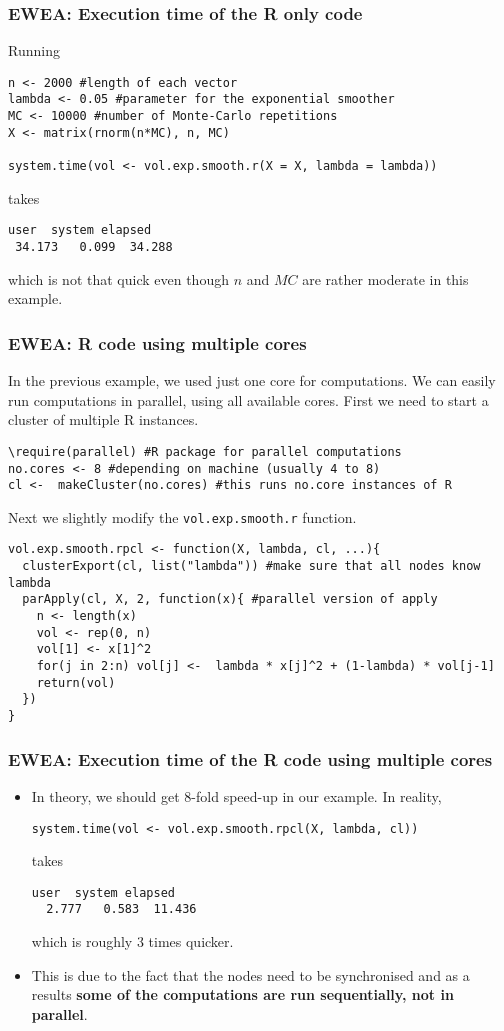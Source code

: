 \documentclass[handout]{beamer}
\begin{document}
\begin{frame}[fragile]
	\frametitle{EWEA: Execution time of the R only code} 
Running 

\begin{Verbatim}[fontsize=\footnotesize]
n <- 2000 #length of each vector
lambda <- 0.05 #parameter for the exponential smoother
MC <- 10000 #number of Monte-Carlo repetitions
X <- matrix(rnorm(n*MC), n, MC)

system.time(vol <- vol.exp.smooth.r(X = X, lambda = lambda))
\end{Verbatim}
takes
\begin{Verbatim}[fontsize=\footnotesize]
user  system elapsed 
 34.173   0.099  34.288 
\end{Verbatim}
which is not that quick even though $n$ and $MC$ are rather moderate in this example.
\end{frame}


\begin{frame}[fragile]
	\frametitle{EWEA: R code using multiple cores}
In the previous example, we used just one core for computations. We can easily run computations in parallel, using all available cores. First we need to start a cluster of multiple R instances.
\begin{Verbatim}[fontsize=\footnotesize]
\require(parallel) #R package for parallel computations
no.cores <- 8 #depending on machine (usually 4 to 8)
cl <-  makeCluster(no.cores) #this runs no.core instances of R
\end{Verbatim}
Next we slightly modify the \texttt{vol.exp.smooth.r} function.

\begin{Verbatim}[fontsize=\footnotesize]
vol.exp.smooth.rpcl <- function(X, lambda, cl, ...){
  clusterExport(cl, list("lambda")) #make sure that all nodes know lambda
  parApply(cl, X, 2, function(x){ #parallel version of apply 
    n <- length(x)  
    vol <- rep(0, n)
    vol[1] <- x[1]^2  
    for(j in 2:n) vol[j] <-  lambda * x[j]^2 + (1-lambda) * vol[j-1]  
    return(vol)
  })
}
\end{Verbatim}
\end{frame}

\begin{frame}[fragile]
\frametitle{EWEA: Execution time of the R code using multiple cores}

\begin{itemize}
\item In theory, we should get 8-fold speed-up in our example. In reality,
\begin{Verbatim}[fontsize=\footnotesize]
system.time(vol <- vol.exp.smooth.rpcl(X, lambda, cl))
\end{Verbatim}
takes 
\begin{Verbatim}[fontsize=\footnotesize]
   user  system elapsed 
  2.777   0.583  11.436
\end{Verbatim}
which is roughly 3 times quicker.
\item  This is due to the fact that the nodes need to be synchronised and as a results \textbf{some of the computations are run sequentially, not in parallel}.
\end{itemize}


\end{frame}
\end{document}

